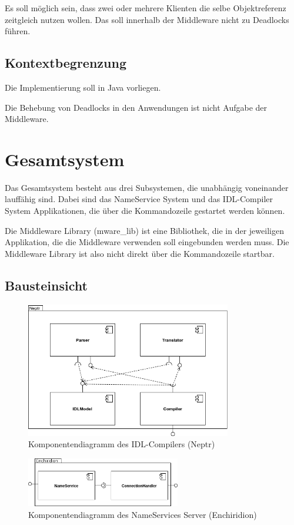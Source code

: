 \documentclass{article}
\begin{document}
Es soll möglich sein, dass zwei oder mehrere Klienten die selbe Objektreferenz zeitgleich
nutzen wollen. Das soll innerhalb der Middleware nicht zu Deadlocks führen.

\subsection{Kontextbegrenzung}
Die Implementierung soll in Java vorliegen.

Die Behebung von Deadlocks in den Anwendungen ist nicht Aufgabe der Middleware.

\newpage

\section{Gesamtsystem}
Das Gesamtsystem besteht aus drei Subsystemen, die unabhängig voneinander lauffähig sind.
Dabei sind das NameService System und das IDL-Compiler System Applikationen, die über
die Kommandozeile gestartet werden können.

Die Middleware Library (mware\_lib) ist eine Bibliothek, die in der jeweiligen Applikation,
die die Middleware verwenden soll eingebunden werden muss. Die Middleware Library ist also
nicht direkt über die Kommandozeile startbar.

\subsection{Bausteinsicht}
\begin{figure}[H]
    \centering
    \includegraphics[width=0.8\textwidth]{compiler-components.png}
    \caption[compiler-components]{Komponentendiagramm des IDL-Compilers (Neptr)}
    \label{fig:compiler-component-diagram}
\end{figure}

\begin{figure}[H]
    \centering
    \includegraphics[width=0.6\textwidth]{nameservice-components.png}
    \caption[nameservice-components]{Komponentendiagramm des NameServices Server (Enchiridion)}
    \label{fig:nameservice-component-diagram}
\end{figure}
\end{document}
